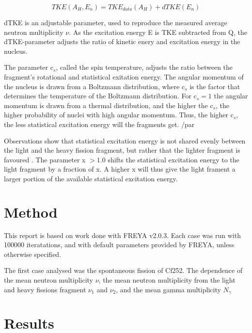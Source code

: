 \documentclass[]{article}
\begin{document}
\begin{equation}
	\label{eq:total_kinetiv_energy}
	TKE(A_H, E_n) = TKE_{data}(A_H) + dTKE(E_n)
\end{equation}

dTKE is an adjustable parameter, used to reproduce the measured average neutron multiplicity $\nu$. As the excitation energy E is TKE subtracted from Q, the dTKE-parameter adjusts the ratio of kinetic enery and excitation energy in the nucleus. \par 
\vspace{3mm}

The parameter c$_s$, called the spin temperature, adjusts the ratio between the fragment's rotational and statistical exitation energy. The angular momentum of the nucleus is drawn from a Boltzmann distribution, where c$_s$ is the factor that determines the temperature of the Boltzmann distribution. For c$_s = 1$ the angular momentum is drawn from a thermal distribution, and the higher the c$_s$, the higher probability of nuclei with high angular momentum. Thus, the higher c$_s$, the less statistical excitation energy will the fragments get. /par 

\vspace{3mm}

Observations show that statistical excitation energy is not shared evenly between the light and the heavy fission fragment, but rather that the lighter fragment is favoured \cite{FREYAusemanual}. The parameter x $>1.0$ shifts the statistical excitation energy to the light fragment by a fraction of x. A higher x will thus give the light frament a larger portion of the available statistical excitation energy.

\section{Method}

This report is based on work done with FREYA v2.0.3. Each case was run with 100000 iteratations, and with default parameters provided by FREYA, unless otherwise specified. 

The first case analysed was the spontaneous fission of Cf252. The dependence of the mean neutron multiplicity $\nu$, the mean neutron multiplicity from the light  and heavy fissions fragment $\nu_1$ and $\nu_2$, and the mean gamma multiplicity $N_{\gamma}$

\section{Results}
\end{document}
